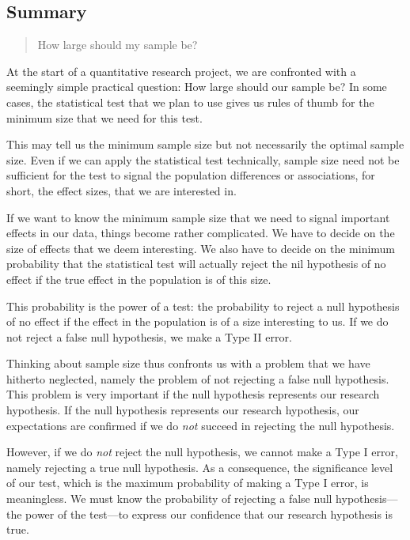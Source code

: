 \documentclass[a4paper]{book}
\theoremstyle{definition}
\theoremstyle{definition}
\theoremstyle{definition}
\theoremstyle{remark}
\begin{document}
\subsection*{Summary}\label{summary-4}

\begin{quote}
How large should my sample be?
\end{quote}

At the start of a quantitative research project, we are confronted with
a seemingly simple practical question: How large should our sample be?
In some cases, the statistical test that we plan to use gives us rules
of thumb for the minimum size that we need for this test.

This may tell us the minimum sample size but not necessarily the optimal
sample size. Even if we can apply the statistical test technically,
sample size need not be sufficient for the test to signal the population
differences or associations, for short, the effect sizes, that we are
interested in.

If we want to know the minimum sample size that we need to signal
important effects in our data, things become rather complicated. We have
to decide on the size of effects that we deem interesting. We also have
to decide on the minimum probability that the statistical test will
actually reject the nil hypothesis of no effect if the true effect in
the population is of this size.

This probability is the power of a test: the probability to reject a
null hypothesis of no effect if the effect in the population is of a
size interesting to us. If we do not reject a false null hypothesis, we
make a Type II error.

Thinking about sample size thus confronts us with a problem that we have
hitherto neglected, namely the problem of not rejecting a false null
hypothesis. This problem is very important if the null hypothesis
represents our research hypothesis. If the null hypothesis represents
our research hypothesis, our expectations are confirmed if we do
\emph{not} succeed in rejecting the null hypothesis.

However, if we do \emph{not} reject the null hypothesis, we cannot make
a Type I error, namely rejecting a true null hypothesis. As a
consequence, the significance level of our test, which is the maximum
probability of making a Type I error, is meaningless. We must know the
probability of rejecting a false null hypothesis---the power of the
test---to express our confidence that our research hypothesis is true.
\end{document}
